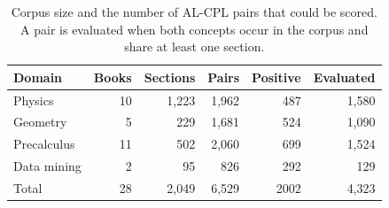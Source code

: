 \begin{table}[t]
  \centering
  \caption{Corpus size and the number of AL-CPL pairs that could be scored. A pair is evaluated when both concepts occur in the corpus and share at least one section.}
  \label{tab:corpus}
  \begin{tabular}{lrrrrr}
    \toprule
    Domain & Books & Sections & Pairs & Positive & Evaluated \\
    \midrule
  Physics & 10 & 1,223 & 1,962 & 487 & 1,580 \\
  Geometry & 5 & 229 & 1,681 & 524 & 1,090 \\
  Precalculus & 11 & 502 & 2,060 & 699 & 1,524 \\
  Data mining & 2 & 95 & 826 & 292 & 129 \\
    \midrule
  Total & 28 & 2,049 & 6,529 & 2002 & 4,323 \\
    \bottomrule
  \end{tabular}
\end{table}
